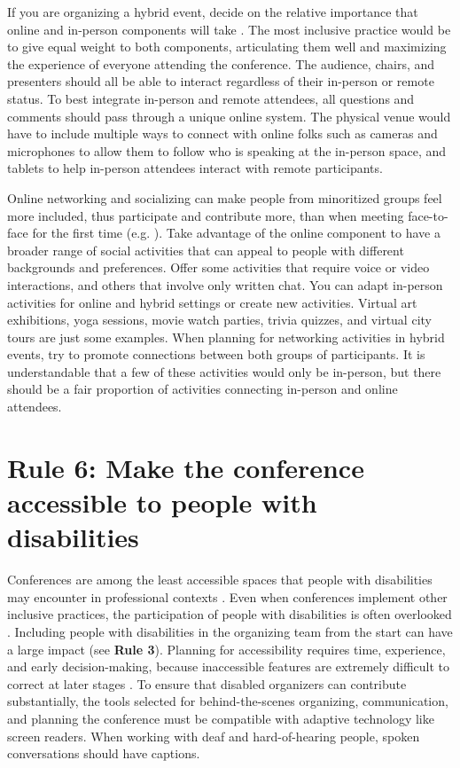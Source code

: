 \documentclass[10pt,letterpaper]{article}
\begin{document}
If you are organizing a hybrid event, decide on the relative importance that online and in-person components will take \cite{bajpai_towards_2021}. The most inclusive practice would be to give equal weight to both components, articulating them well and maximizing the experience of everyone attending the conference.
The audience, chairs, and presenters should all be able to interact regardless of their in-person or remote status. 
To best integrate in-person and remote attendees, all questions and comments should pass through a unique online system. 
The physical venue would have to include multiple ways to connect with online folks such as cameras and microphones to allow them to follow who is speaking at the in-person space, and tablets to help in-person attendees interact with remote participants.

Online networking and socializing can make people from minoritized groups feel more included, thus participate and contribute more, than when meeting face-to-face for the first time (e.g. \cite{trianaDoesOrderFacetoFace2012,blackEngenderingBelongingThoughtful2020}).
Take advantage of the online component to have a broader range of social activities that can appeal to people with different backgrounds and preferences.
Offer some activities that require voice or video interactions, and others that involve only written chat.
You can adapt in-person activities for online and hybrid settings or create new activities. 
Virtual art exhibitions, yoga sessions, movie watch parties, trivia quizzes, and virtual city tours are just some examples.
When planning for networking activities in hybrid events, try to
promote connections between both groups of participants.
It is understandable that a few of these activities would only be in-person, but 
there should be a fair proportion of activities connecting in-person and online attendees. 


\section*{Rule 6: Make the conference accessible to people with disabilities}
\label{rule_accessibility}

Conferences are among the least accessible spaces that people with disabilities may encounter in professional contexts \cite{priceAccessImaginedConstruction2009}. Even when conferences implement other inclusive practices, the participation of people with disabilities is often overlooked \cite{marks2021meeting}. Including people with disabilities in the organizing team from the start can have a large impact (see \textbf{Rule 3}). Planning for accessibility requires time, experience, and early decision-making, because inaccessible features are extremely difficult to correct at later stages \cite{irishIncreasingParticipationUsing2020}. To ensure that disabled organizers can contribute substantially, the tools selected for behind-the-scenes organizing, communication, and planning the conference must be compatible with adaptive technology like screen readers. When working with deaf and hard-of-hearing people, spoken conversations should have captions.
\end{document}
